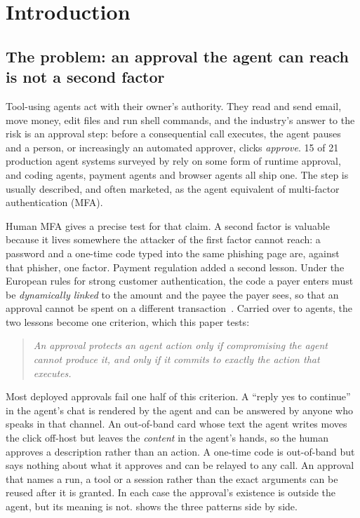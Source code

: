 \section{Introduction}\label{sec:intro}

\subsection{The problem: an approval the agent can reach is not a second factor}

Tool-using agents act with their owner's authority. They read and send email, move money, edit files and run
shell commands, and the industry's answer to the risk is an approval step: before a consequential call executes,
the agent pauses and a person, or increasingly an automated approver, clicks \emph{approve}. 15 of 21 production agent systems surveyed
by \citet{wang2026reframing} rely on some form of runtime approval, and coding agents, payment agents and
browser agents all ship one. The step is usually described, and often marketed, as the agent equivalent of
multi-factor authentication (MFA).

Human MFA gives a precise test for that claim. A second factor is valuable
because it lives somewhere the attacker of the first factor cannot reach: a password and a one-time code typed
into the same phishing page are, against that phisher, one factor. Payment regulation added a second lesson.
Under the European rules for strong customer authentication, the code a payer enters must be
\emph{dynamically linked} to the amount and the payee the payer sees, so that an approval cannot be spent on a
different transaction~\citep{psd2rts2018}. Carried over to agents, the two lessons become one criterion,
which this paper tests:
\begin{quote}
\emph{An approval protects an agent action only if compromising the agent cannot produce it, and only if it
commits to exactly the action that executes.}
\end{quote}
Most deployed approvals fail one half of this criterion. A ``reply yes to continue'' in the agent's chat is
rendered by the agent and can be answered by anyone who speaks in that channel. An out-of-band card whose text
the agent writes moves the click off-host but leaves the \emph{content} in the agent's hands, so the human
approves a description rather than an action. A one-time code is out-of-band but says nothing about what it
approves and can be relayed to any call. An approval that names a run, a tool or a session rather than the
exact arguments can be reused after it is granted. In each case the approval's existence is outside the agent,
but its meaning is not.  shows the three patterns side by side.

